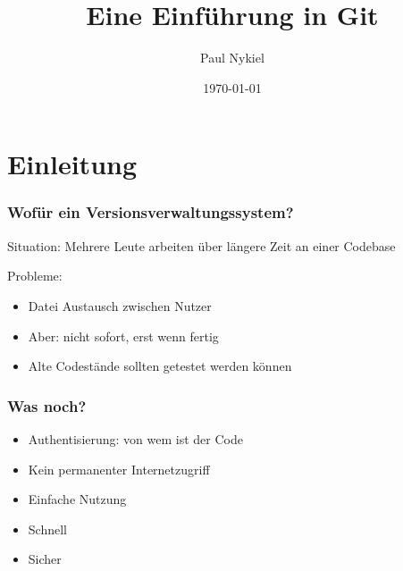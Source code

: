 \documentclass[aspectratio=169]{beamer}
\title{Eine Einführung in Git}
\author{Paul Nykiel}
\date{\today}
\begin{document}
\maketitle


\section{Einleitung}
\begin{frame}
    \frametitle{Wofür ein Versionsverwaltungssystem?}
    Situation: Mehrere Leute arbeiten über längere Zeit an einer Codebase

    \vspace{.5cm}

    \pause
    Probleme:
    \pause
    \begin{itemize}
        \item Datei Austausch zwischen Nutzer
            \pause
        \item Aber: nicht sofort, erst wenn fertig
            \pause
        \item Alte Codestände sollten getestet werden können
    \end{itemize}
\end{frame}

\begin{frame}
    \frametitle{Was noch?}
    \begin{itemize}
        \item Authentisierung: von wem ist der Code
            \pause
        \item Kein permanenter Internetzugriff 
            \pause
        \item Einfache Nutzung
            \pause
        \item Schnell
            \pause
        \item Sicher
    \end{itemize}
\end{frame}
\end{document}
